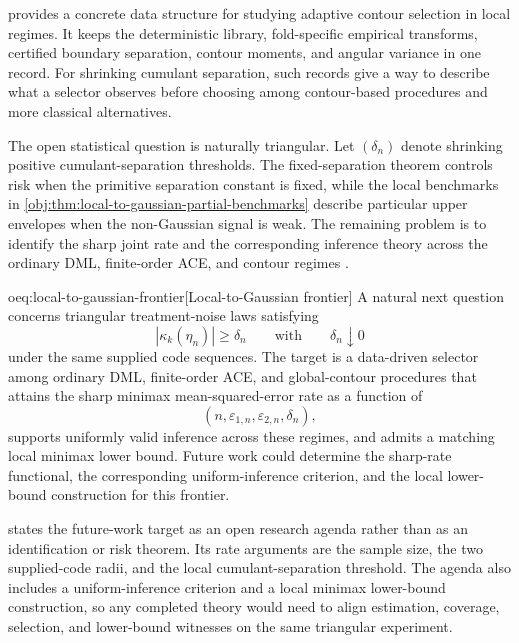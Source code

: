 \documentclass[11pt]{article}
\begin{document}
 provides a concrete data structure for studying adaptive contour selection in local regimes. It keeps the deterministic library, fold-specific empirical transforms, certified boundary separation, contour moments, and angular variance in one record. For shrinking cumulant separation, such records give a way to describe what a selector observes before choosing among contour-based procedures and more classical alternatives.

The open statistical question is naturally triangular. Let \((\delta_n)\) denote shrinking positive cumulant-separation thresholds. The fixed-separation theorem controls risk when the primitive separation constant is fixed, while the local benchmarks in \cref{obj:thm:local-to-gaussian-partial-benchmarks} describe particular upper envelopes when the non-Gaussian signal is weak. The remaining problem is to identify the sharp joint rate and the corresponding inference theory across the ordinary DML, finite-order ACE, and contour regimes \citep{ChernozhukovEtAl2018DML,NeweyRobins2018,MackeySyrgkanisZadik2018,JinMackeySyrgkanis2025,LeeMesters2024,HoeschLeeMesters2024}.

\begin{remarkv}{oeq:local-to-gaussian-frontier}[Local-to-Gaussian frontier]
A natural next question concerns triangular treatment-noise laws satisfying
\[
|\kappa_k(\eta_n)|\ge\delta_n
\qquad\text{with}\qquad
\delta_n\downarrow0
\]
under the same supplied code sequences. The target is a data-driven selector among ordinary DML, finite-order ACE, and global-contour procedures that attains the sharp minimax mean-squared-error rate as a function of
\[
(n,\varepsilon_{1,n},\varepsilon_{2,n},\delta_n),
\]
supports uniformly valid inference across these regimes, and admits a matching local minimax lower bound. Future work could determine the sharp-rate functional, the corresponding uniform-inference criterion, and the local lower-bound construction for this frontier.
\end{remarkv}

 states the future-work target as an open research agenda rather than as an identification or risk theorem. Its rate arguments are the sample size, the two supplied-code radii, and the local cumulant-separation threshold. The agenda also includes a uniform-inference criterion and a local minimax lower-bound construction, so any completed theory would need to align estimation, coverage, selection, and lower-bound witnesses on the same triangular experiment.
\end{document}
